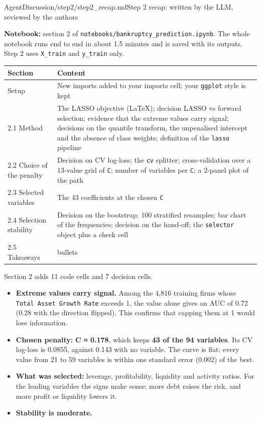 \begin{mdfile}{AgentDiscussion/\allowbreak{}step2/\allowbreak{}step2\_recap.md}{Step 2 recap: written by the LLM, reviewed by the authors}

\textbf{Notebook:} section 2 of \texttt{notebooks/bankruptcy\_prediction.ipynb}. The whole notebook runs end to end in about 1.5 minutes and is saved with its outputs. Step 2 uses \texttt{X\_train} and \texttt{y\_train} only.


{\def\LTcaptype{none} %
\begin{tabularx}{\linewidth}{@{}l>{\raggedright\arraybackslash}X@{}}
\toprule\noalign{}
Section & Content \\
\midrule\noalign{}
Setup & New imports added to your imports cell; your \texttt{ggplot} style is kept \\
2.1 Method & The LASSO objective (LaTeX); decision LASSO vs forward selection; evidence that the extreme values carry signal; decisions on the quantile transform, the unpenalised intercept and the absence of class weights; definition of the \texttt{lasso} pipeline \\
2.2 Choice of the penalty & Decision on CV log-loss; the \texttt{cv} splitter; cross-validation over a 13-value grid of \texttt{C}; number of variables per \texttt{C}; a 2-panel plot of the path \\
2.3 Selected variables & The 43 coefficients at the chosen \texttt{C} \\
2.4 Selection stability & Decision on the bootstrap; 100 stratified resamples; bar chart of the frequencies; decision on the hand-off; the \texttt{selector} object plus a check cell \\
2.5 Takeaways & 5 bullets \\
\bottomrule
\end{tabularx}
}

Section 2 adds 11 code cells and 7 decision cells.


\begin{itemize}
\tightlist
\item
  \textbf{Extreme values carry signal.} Among the 4,816 training firms whose \texttt{Total\ Asset\ Growth\ Rate} exceeds 1, the value alone gives an AUC of 0.72 (0.28 with the direction flipped). This confirms that capping them at 1 would lose information.
\item
  \textbf{Chosen penalty:} \textbf{C ≈ 0.178}, which keeps \textbf{43 of the 94 variables}. Its CV log-loss is 0.0855, against 0.143 with no variable. The curve is flat: every value from 21 to 59 variables is within one standard error (0.002) of the best.
\item
  \textbf{What was selected:} leverage, profitability, liquidity and activity ratios. For the leading variables the signs make sense: more debt raises the risk, and more profit or liquidity lowers it.
\item
  \textbf{Stability is moderate.}


\end{itemize}
\end{mdfile}
